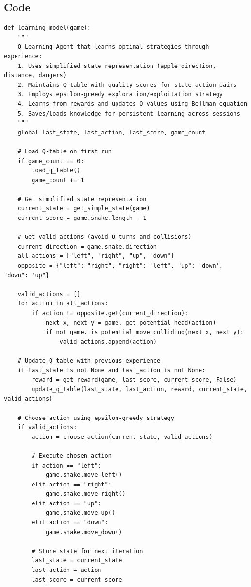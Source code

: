 \documentclass[11pt,a4paper]{article}
\begin{document}
\subsection{Code}
\begin{lstlisting}[caption=Q-Learning Agent]
def learning_model(game):
    """
    Q-Learning Agent that learns optimal strategies through experience:
    1. Uses simplified state representation (apple direction, distance, dangers)
    2. Maintains Q-table with quality scores for state-action pairs
    3. Employs epsilon-greedy exploration/exploitation strategy
    4. Learns from rewards and updates Q-values using Bellman equation
    5. Saves/loads knowledge for persistent learning across sessions
    """
    global last_state, last_action, last_score, game_count
    
    # Load Q-table on first run
    if game_count == 0:
        load_q_table()
        game_count += 1
    
    # Get simplified state representation
    current_state = get_simple_state(game)
    current_score = game.snake.length - 1
    
    # Get valid actions (avoid U-turns and collisions)
    current_direction = game.snake.direction
    all_actions = ["left", "right", "up", "down"]
    opposite = {"left": "right", "right": "left", "up": "down", "down": "up"}
    
    valid_actions = []
    for action in all_actions:
        if action != opposite.get(current_direction):
            next_x, next_y = game._get_potential_head(action)
            if not game._is_potential_move_colliding(next_x, next_y):
                valid_actions.append(action)
    
    # Update Q-table with previous experience
    if last_state is not None and last_action is not None:
        reward = get_reward(game, last_score, current_score, False)
        update_q_table(last_state, last_action, reward, current_state, valid_actions)
    
    # Choose action using epsilon-greedy strategy
    if valid_actions:
        action = choose_action(current_state, valid_actions)
        
        # Execute chosen action
        if action == "left":
            game.snake.move_left()
        elif action == "right":
            game.snake.move_right()
        elif action == "up":
            game.snake.move_up()
        elif action == "down":
            game.snake.move_down()
        
        # Store state for next iteration
        last_state = current_state
        last_action = action
        last_score = current_score


\end{lstlisting}
\end{document}
